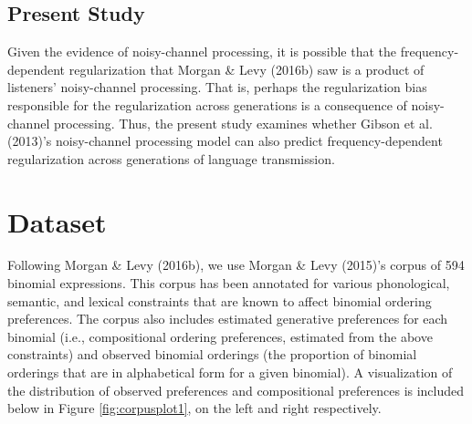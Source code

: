 \documentclass[10pt, letterpaper]{article}
\begin{document}
\hypertarget{present-study}{%
\subsection{Present Study}\label{present-study}}

Given the evidence of noisy-channel processing, it is possible that the
frequency-dependent regularization that Morgan \& Levy (2016b) saw is a
product of listeners' noisy-channel processing. That is, perhaps the
regularization bias responsible for the regularization across
generations is a consequence of noisy-channel processing. Thus, the
present study examines whether Gibson et al. (2013)'s noisy-channel
processing model can also predict frequency-dependent regularization
across generations of language transmission.

\hypertarget{dataset}{%
\section{Dataset}\label{dataset}}

Following Morgan \& Levy (2016b), we use Morgan \& Levy (2015)'s corpus
of 594 binomial expressions. This corpus has been annotated for various
phonological, semantic, and lexical constraints that are known to affect
binomial ordering preferences. The corpus also includes estimated
generative preferences for each binomial (i.e., compositional ordering
preferences, estimated from the above constraints) and observed binomial
orderings (the proportion of binomial orderings that are in alphabetical
form for a given binomial). A visualization of the distribution of
observed preferences and compositional preferences is included below in
Figure \ref{fig:corpusplot1}, on the left and right respectively.
\end{document}
